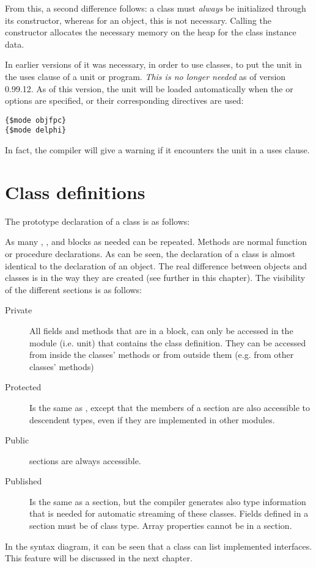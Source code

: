 From this, a second difference follows: a class must {\em always} be initialized
through its constructor, whereas for an object, this is not necessary.
Calling the constructor allocates the necessary memory on the heap for the
class instance data. 

\begin{remark}
In earlier versions of \fpc it was necessary, in order to use classes,
to put the  unit in the uses clause of a unit or program.
{\em This is no longer needed} as of version 0.99.12. As of this version,
the unit will be loaded automatically when the  or
  options are specified, or their corresponding directives are
used:
\begin{verbatim}
{$mode objfpc}
{$mode delphi}
\end{verbatim}
In fact, the compiler will give a warning if it encounters the
 unit in a uses clause.
\end{remark}

\section{Class definitions}
The prototype declaration of a class is as follows:

As many , , 
and  blocks as needed can be repeated.
Methods are normal function or procedure declarations.
As can be seen, the declaration of a class is almost identical to the
declaration of an object. The real difference between objects and classes
is in the way they are created (see further in this chapter).
The visibility of the different sections is as follows:
\begin{description}
\item [Private\ ]  All fields and methods that are in a  block, can
only be accessed in the module (i.e. unit) that contains the class definition.
They can be accessed from inside the classes' methods or from outside them
(e.g. from other classes' methods)
\item [Protected\ ] %
Is the same as , except that the members of
a  section are also accessible to descendent types, even if
they are implemented in other modules.
\item [Public\ ]  sections are always
accessible.
\item [Published\ ]  Is the same as a  section, but the compiler
generates also type information that is needed for automatic streaming of
these classes. Fields defined in a  section must be of class type.
Array properties cannot be in a 
section.
\end{description}
In the syntax diagram, it can be seen that a class can list implemented
interfaces. This feature will be discussed in the next chapter.

